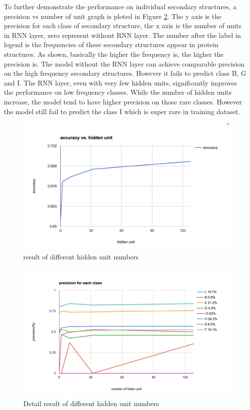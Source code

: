 To further demonstrate the performance on individual secondary structures, a precision vs number of unit graph is ploted in Figure \ref{fig:exp_hidden_detail}. The y axis is the precision for each class of secondary structure, the x axis is the number of units in RNN layer, zero represent without RNN layer. The number after the label in legend is the frequencies of these secondary structures appear in protein structures. As shown, basically the higher the frequency is, the higher the precision is. The model without the RNN layer can achieve comparable precision on the high frequency secondary structures. However it fails to predict class B, G and I. The RNN layer, even with very few hidden units, significantly improves the performance on low frequency classes. While the number of hidden units increase, the model tend to have higher precision on those rare classes. However the model still fail to predict the class I which is super rare in training dataset. \par
\begin{figure}[h] 
	\centering
	\includegraphics[width=6in]{Figures/exp_hidden}
	\caption[result of different hidden unit numbers]{result of different hidden unit numbers}
	\label{fig:exp_hidden}
\end{figure}

\begin{figure}[h] 
	\centering
	\includegraphics[width=6in]{Figures/exp_hidden_detail}
	\caption[Detail result of different hidden unit numbers]{Detail result of different hidden unit numbers}
	\label{fig:exp_hidden_detail}
\end{figure}

